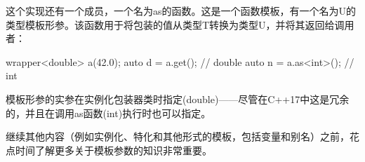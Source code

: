 这个实现还有一个成员，一个名为as的函数。这是一个函数模板，有一个名为U的类型模板形参。该函数用于将包装的值从类型T转换为类型U，并将其返回给调用者：


\begin{cppcode}
wrapper<double> a(42.0);
auto d = a.get(); // double
auto n = a.as<int>(); // int
\end{cppcode}

模板形参的实参在实例化包装器类时指定(double)——尽管在C++17中这是冗余的，并且在调用as函数(int)执行时也可以指定。

继续其他内容（例如实例化、特化和其他形式的模板，包括变量和别名）之前，花点时间了解更多关于模板参数的知识非常重要。







